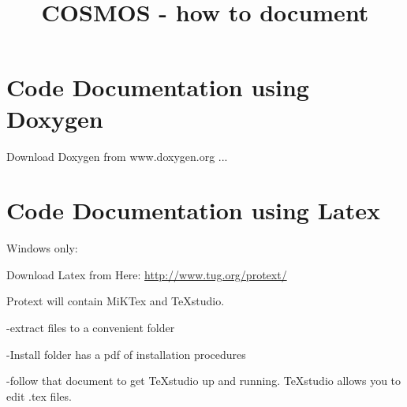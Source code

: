 

\title{COSMOS - how to document}



\maketitle
\tableofcontents


\section{Code Documentation using Doxygen}
Download Doxygen from www.doxygen.org ...


\section{Code Documentation using Latex}

Windows only:

Download Latex from Here: \url{http://www.tug.org/protext/}

Protext will contain MiKTex and TeXstudio.

-extract files to a convenient folder

-Install folder has a pdf of installation procedures

-follow that document to get TeXstudio up and running. TeXstudio allows you to edit .tex files.


